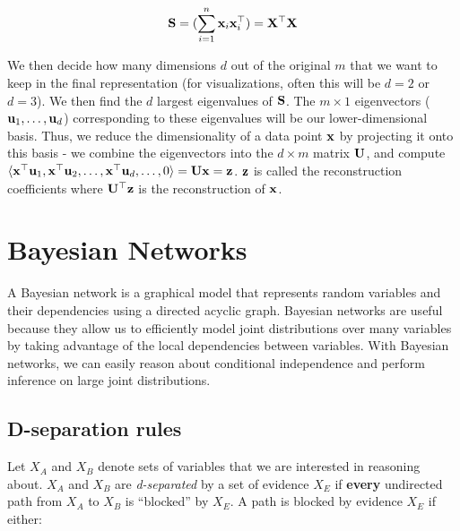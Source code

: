 \documentclass[11pt,letterpaper]{article}
\begin{document}
  \[ \mathbf{S} = (\sum_{i=1}^n   \mathbf{x}_i\mathbf{x}_i^\top)  = \mathbf{X}^\top \mathbf{X} \]
  
We then decide how many dimensions $d$ out of the original $m$ that we want to keep in the final representation (for visualizations, often this will be $d=2$ or $d=3$). We then find the $d$ largest eigenvalues of $\mathbf{S}$. The $m \times 1$ eigenvectors ($\mathbf{u}_1, \dots ,\mathbf{u}_d$) corresponding to these eigenvalues will be our lower-dimensional basis. Thus, we reduce the dimensionality of a data point $\mathbf{x}$ by projecting it onto this basis - we combine the eigenvectors into the $d \times m$ matrix $\mathbf{U}$, and compute $\langle \mathbf{x}^\top\mathbf{u}_1, \mathbf{x}^\top\mathbf{u}_2, \ldots, \mathbf{x}^\top \mathbf{u}_d, \ldots, 0 \rangle = \mathbf{U}\mathbf{x} = \mathbf{z}$. $\mathbf{z}$ is called the reconstruction coefficients where $\mathbf{U}^\top \mathbf{z}$ is the reconstruction of $\mathbf{x}$.

\section{Bayesian Networks}

A Bayesian network is a graphical model that represents random variables and their dependencies using a directed acyclic graph. Bayesian networks are useful because they allow us to efficiently model joint distributions over many variables by taking advantage of the local dependencies between variables. With Bayesian networks, we can easily reason about conditional independence and perform inference on large joint distributions.

\subsection{D-separation rules}

Let $X_A$ and $X_B$ denote sets of variables that we are interested in reasoning about.
$X_A$ and $X_B$ are \textit{d-separated} by a set of evidence $X_E$ if \textbf{every} undirected path from $X_A$ to $X_B$ is ``blocked'' by $X_E$. A path is blocked by evidence $X_E$ if either:
\end{document}
